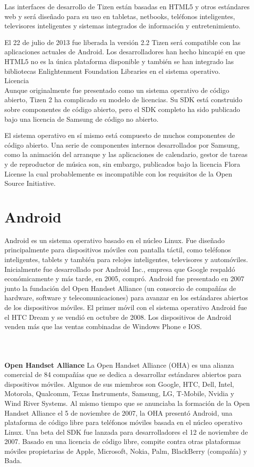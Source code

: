 Las interfaces de desarrollo de Tizen están basadas en HTML5 y otros estándares web y será diseñado para su uso en tabletas, netbooks, teléfonos inteligentes, televisores inteligentes y sistemas integrados de información y entretenimiento.

El 22 de julio de 2013 fue liberada la versión 2.2 Tizen será compatible con las aplicaciones actuales de Android. Los desarrolladores han hecho hincapié en que HTML5 no es la única plataforma disponible y también se han integrado las bibliotecas Enlightenment Foundation Libraries en el sistema operativo.
\\
Licencia
\\
Aunque originalmente fue presentado como un sistema operativo de código abierto, Tizen 2 ha complicado su modelo de licencias. Su SDK está construido sobre componentes de código abierto, pero el SDK completo ha sido publicado bajo una licencia de Samsung de código no abierto.

El sistema operativo en sí mismo está compuesto de muchos componentes de código abierto. Una serie de componentes internos desarrollados por Samsung, como la animación del arranque y las aplicaciones de calendario, gestor de tareas y de reproductor de música son, sin embargo, publicados bajo la licencia Flora License la cual probablemente es incompatible con los requisitos de la Open Source Initiative.

\section{Android}
Android es un sistema operativo basado en el núcleo Linux. Fue diseñado principalmente para dispositivos móviles con pantalla táctil, como teléfonos inteligentes, tablets y también para relojes inteligentes, televisores y automóviles. Inicialmente fue desarrollado por Android Inc., empresa que Google respaldó económicamente y más tarde, en 2005, compró. Android fue presentado en 2007 junto la fundación del Open Handset Alliance (un consorcio de compañías de hardware, software y telecomunicaciones) para avanzar en los estándares abiertos de los dispositivos móviles. El primer móvil con el sistema operativo Android fue el HTC Dream y se vendió en octubre de 2008. Los dispositivos de Android venden más que las ventas combinadas de Windows Phone e IOS.
\\
\\
\\
\\
{\bf  Open Handset Alliance}
La Open Handset Alliance (OHA) es una alianza comercial de 84 compañías que se dedica a desarrollar estándares abiertos para dispositivos móviles. Algunos de sus miembros son Google, HTC, Dell, Intel, Motorola, Qualcomm, Texas Instruments, Samsung, LG, T-Mobile, Nvidia y Wind River Systems.
Al mismo tiempo que se anunciaba la formación de la Open Handset Alliance el 5 de noviembre de 2007, la OHA presentó Android, una plataforma de código libre para teléfonos móviles basada en el núcleo operativo Linux. Una beta del SDK fue lanzada para desarrolladores el 12 de noviembre de 2007. Basado en una licencia de código libre, compite contra otras plataformas móviles propietarias de Apple, Microsoft, Nokia, Palm, BlackBerry (compañía) y Bada.

